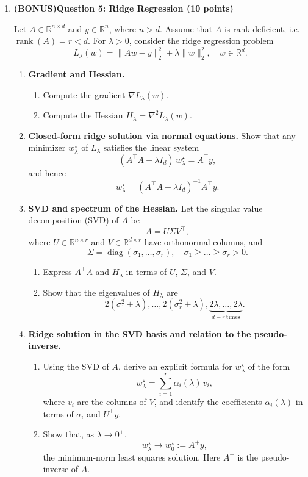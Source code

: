 \documentclass[11pt,letterpaper]{article}
\begin{document}
\begin{enumerate}
\clearpage
\item[] \textbf{(BONUS)Question 5: Ridge Regression (10 points)}


Let $A \in \mathbb{R}^{n \times d}$ and $y \in \mathbb{R}^n$, where $ n > d$. Assume that $A$ is rank-deficient, i.e.\ $\operatorname{rank}(A) = r < d$.
For $\lambda > 0$, consider the ridge regression problem
\[
L_\lambda(w) = \|Aw - y\|_2^2 + \lambda \|w\|_2^2, 
\quad w \in \mathbb{R}^d.
\]

\begin{enumerate}[label=(\alph*)]

  \item \textbf{Gradient and Hessian.} 
  \begin{enumerate}[]
    \item Compute the gradient $\nabla L_\lambda(w)$.
    \item Compute the Hessian $H_\lambda = \nabla^2 L_\lambda(w)$.
  \end{enumerate}

  \item \textbf{Closed-form ridge solution via normal equations.}  
  Show that any minimizer $w_\lambda^\star$ of $L_\lambda$ satisfies the linear system
  \[
  (A^\top A + \lambda I_d)\, w_\lambda^\star = A^\top y,
  \]
  and hence
  \[
  w_\lambda^\star = (A^\top A + \lambda I_d)^{-1} A^\top y.
  \]

  \item \textbf{SVD and spectrum of the Hessian.}
  Let the singular value decomposition (SVD) of $A$ be
  \[
  A = U \Sigma V^\top,
  \]
  where $U \in \mathbb{R}^{n \times r}$ and $V \in \mathbb{R}^{d \times r}$ have orthonormal columns, and
  \[
  \Sigma = \operatorname{diag}(\sigma_1,\dots,\sigma_r), \quad
  \sigma_1 \ge \dots \ge \sigma_r > 0.
  \]
  \begin{enumerate}
    \item Express $A^\top A$ and $H_\lambda$ in terms of $U$, $\Sigma$, and $V$.
    \item Show that the eigenvalues of $H_\lambda$ are
    \[
    2(\sigma_1^2 + \lambda),\dots,2(\sigma_r^2 + \lambda),
    \underbrace{2\lambda,\dots,2\lambda}_{d-r\ \text{times}}.
    \]
  \end{enumerate}

  \item \textbf{Ridge solution in the SVD basis and relation to the pseudo-inverse.}
  \begin{enumerate}
    \item Using the SVD of $A$, derive an explicit formula for $w_\lambda^\star$ of the form
    \[
    w_\lambda^\star = \sum_{i=1}^r \alpha_i(\lambda)\, v_i,
    \]
    where $v_i$ are the columns of $V$, and identify the coefficients $\alpha_i(\lambda)$ in terms of $\sigma_i$ and $U^\top y$.
    \item Show that, as $\lambda \to 0^+$,
    \[
    w_\lambda^\star \to w_0^\star := A^+ y,
    \]
    the minimum-norm least squares solution. Here $A^+ $ is the pseudo-inverse of $A$.
    

\end{enumerate}
\end{enumerate}
\end{enumerate}
\end{document}
